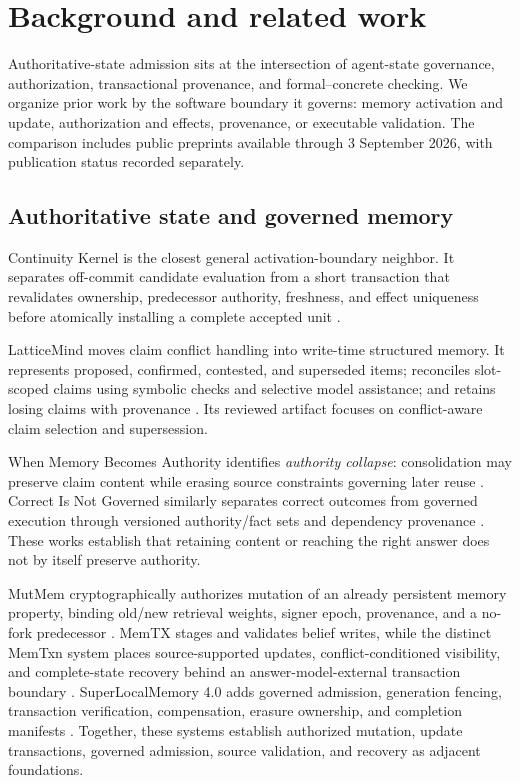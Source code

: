 \section{Background and related work}
\label{sec:related}

Authoritative-state admission sits at the intersection of agent-state governance, authorization, transactional provenance, and formal--concrete checking. We organize prior work by the software boundary it governs: memory activation and update, authorization and effects, provenance, or executable validation. The comparison includes public preprints available through 3 September 2026, with publication status recorded separately.

\subsection{Authoritative state and governed memory}

Continuity Kernel is the closest general activation-boundary neighbor. It separates off-commit candidate evaluation from a short transaction that revalidates ownership, predecessor authority, freshness, and effect uniqueness before atomically installing a complete accepted unit \citep{he2026continuity}.

LatticeMind moves claim conflict handling into write-time structured memory. It represents proposed, confirmed, contested, and superseded items; reconciles slot-scoped claims using symbolic checks and selective model assistance; and retains losing claims with provenance \citep{zhou2026latticemind}. Its reviewed artifact focuses on conflict-aware claim selection and supersession.

When Memory Becomes Authority identifies \emph{authority collapse}: consolidation may preserve claim content while erasing source constraints governing later reuse \citep{zhan2026authoritycollapse}. Correct Is Not Governed similarly separates correct outcomes from governed execution through versioned authority/fact sets and dependency provenance \citep{salas2026governed}. These works establish that retaining content or reaching the right answer does not by itself preserve authority.

MutMem cryptographically authorizes mutation of an already persistent memory property, binding old/new retrieval weights, signer epoch, provenance, and a no-fork predecessor \citep{saidi2026mutmem}. MemTX stages and validates belief writes, while the distinct MemTxn system places source-supported updates, conflict-conditioned visibility, and complete-state recovery behind an answer-model-external transaction boundary \citep{li2026memtx,cui2026memtxn}. SuperLocalMemory 4.0 adds governed admission, generation fencing, transaction verification, compensation, erasure ownership, and completion manifests \citep{bhardwaj2026superlocalmemory}. Together, these systems establish authorized mutation, update transactions, governed admission, source validation, and recovery as adjacent foundations.

